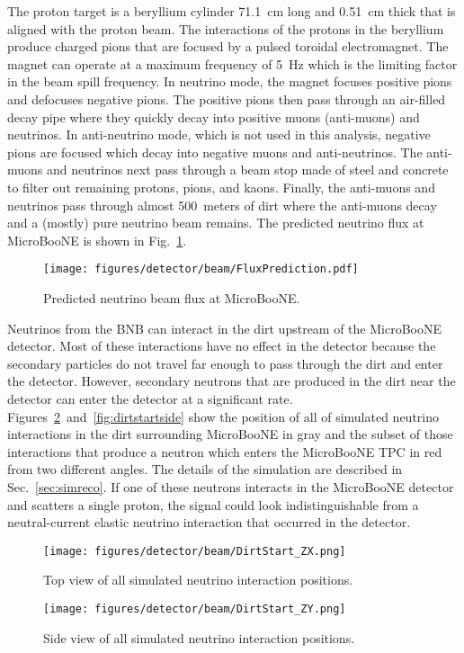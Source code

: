   The proton target is a beryllium cylinder 71.1~cm long and 0.51~cm thick that
  is aligned with the proton beam. The interactions of the protons in the
  beryllium produce charged pions that are focused by a pulsed toroidal
  electromagnet. The magnet can operate at a maximum frequency of 5~Hz which is
  the limiting factor in the beam spill frequency. In neutrino mode, the magnet
  focuses positive pions and defocuses negative pions. The positive pions then
  pass through an air-filled decay pipe where they quickly decay into positive
  muons (anti-muons) and neutrinos. In anti-neutrino mode, which is not used in
  this analysis, negative pions are focused which decay into negative muons and
  anti-neutrinos. The anti-muons and neutrinos next pass through a beam stop
  made of steel and concrete to filter out remaining protons, pions, and kaons.
  Finally, the anti-muons and neutrinos pass through almost 500~meters of dirt
  where the anti-muons decay and a (mostly) pure neutrino beam remains. The
  predicted neutrino flux at MicroBooNE is shown in Fig.~\ref{fig:beamflux}.

  \begin{figure}[h]
    \centering
    \texttt{[image: figures/detector/beam/FluxPrediction.pdf]}
    \caption{Predicted neutrino beam flux at MicroBooNE.}
    \label{fig:beamflux}
  \end{figure}

  Neutrinos from the BNB can interact in the dirt upstream of the MicroBooNE
  detector. Most of these interactions have no effect in the detector because
  the secondary particles do not travel far enough to pass through the dirt and
  enter the detector. However, secondary neutrons that are produced in the dirt
  near the detector can enter the detector at a significant rate.
  Figures~\ref{fig:dirtstarttop}~and~\ref{fig:dirtstartside} show the position
  of all of simulated neutrino interactions in the dirt surrounding MicroBooNE
  in gray and the subset of those interactions that produce a neutron which
  enters the MicroBooNE TPC in red from two different angles. The details of
  the simulation are described in Sec.~\ref{sec:simreco}. If one of these
  neutrons interacts in the MicroBooNE detector and scatters a single proton,
  the signal could look indistinguishable from a neutral-current elastic
  neutrino interaction that occurred in the detector.

  \begin{figure}[h]
    \texttt{[image: figures/detector/beam/DirtStart\_ZX.png]}
    \caption{Top view of all simulated neutrino interaction positions.}
    \label{fig:dirtstarttop}
  \end{figure}
  \begin{figure}[h]
    \texttt{[image: figures/detector/beam/DirtStart\_ZY.png]}
    \caption{Side view of all simulated neutrino interaction positions.}
    \label{fig:dirtstartsize}
  \end{figure}

